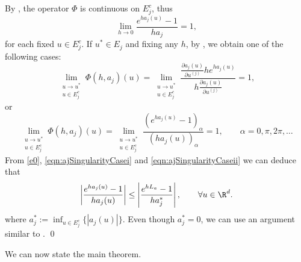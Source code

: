 \begin{pf}    By , the operator $\Phi$ is continuous
	on $E_j^c$, thus 
	\begin{equation}\label{e0}
		\lim_{h\to 0}
		\frac{e^{ha_j(u)}-1}{ha_j}=1,
	\end{equation}
	for each fixed $u\in E_j^c$. If $u^*\in E_j$ and fixing any $h$, by ,  we obtain 
	one of the following cases:
	\begin{equation}\label{eqn:ajSingularityCasei}
				\lim_{
					\substack{
						u \to u^*\\ 
						u\in E_j^c
					}
				}
				\Phi(h,a_j)(u) =
				\lim_{
					\substack{
						u \to u^*\\ 
						u\in E_j^c
					}
				}	
				\frac{\frac{\partial a_j(u)}{\partial u^{(j)}} 
					h e^{h a_j(u)} 
				}{
					h\frac{\partial a_j(u)}{\partial u^{(j)}}
				}=1,
			\end{equation}	
or
			\begin{equation}\label{eqn:ajSingularityCaseii}
			\lim_{
				\substack{
					u \to u^*\\ 
					u\in E_j^c
				}
			}
			\Phi(h,a_j)(u) 
			=
			\lim_{
				\substack{
					u \to u^*\\ 
					u\in E_j^c
				}
			}	
			\frac{
				\left(
					 e^{h a_j(u)} - 1
				 \right)_{\alpha}
			}{
				\left(
					h a_j(u)
				\right)_{\alpha}
			}	=	1, \qquad \alpha = 0,\pi, 2\pi,\dots
		\end{equation}	
	From \eqref{e0}, \eqref{eqn:ajSingularityCasei} and \eqref{eqn:ajSingularityCaseii} we can deduce that 	
	\begin{equation}\label{eqn:PhiBound}
		\left|\frac{e^{ha_j(u)}-1}{ha_j(u)}
		\right|\leq\left|\frac{e^{hL_a}-1}{ha^*_j}
		\right|,
		\qquad \forall u \in \R^d.
	\end{equation}
	where $a^*_j:= \inf_{u\in E_j^c}\{|a_j(u)|\}$. Even though $a^*_j=0$, we can
	use an argument similar to .	\qed	
\end{pf}

We can  now state the main theorem.

